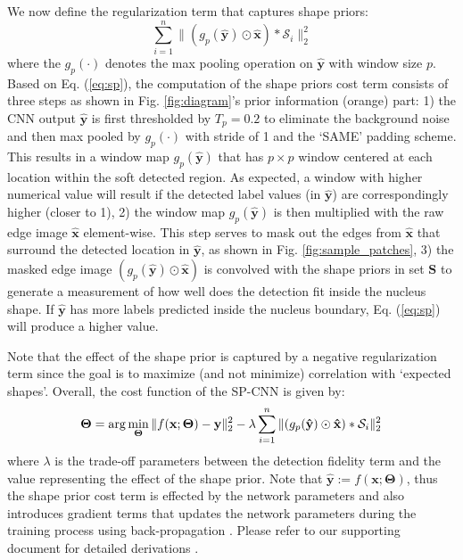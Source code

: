 \documentclass{article}
\begin{document}
We now define the regularization term that captures shape priors:
\begin{equation}
\sum\limits_{i=1}^{n} \|(g_{p}(\mathbf{\hat{y}})\odot \mathbf{\hat{x}}) \ast \mathcal{S}_i \|_2^2\label{eq:sp}
\end{equation}
where the $g_{p}(\cdot)$ denotes the max pooling operation on $\mathbf{\hat{y}}$ with window size $p$. Based on Eq. (\ref{eq:sp}), the computation of the shape priors cost term consists of three steps as shown in Fig. \ref{fig:diagram}'s prior information (orange) part: 1) the CNN output $\mathbf{\hat{y}}$ is first thresholded by $T_p = 0.2$ to eliminate the background noise and then max pooled by $g_p(\cdot)$ with stride of 1 and the `SAME' padding scheme. This results in a window map $g_p(\mathbf{\hat{y}})$ that has $p\times p$ window centered at each location within the soft detected region. 
As expected, a window with higher numerical value will result if the detected label values (in $\mathbf{\hat{y}}$) are correspondingly higher (closer to 1), 2) the window map $g_p(\mathbf{\hat{y}})$ is then multiplied with the raw edge image $\mathbf{\hat{x}}$ element-wise. This step serves to mask out the edges from $\mathbf{\hat{x}}$ that surround the detected location in $\mathbf{\hat{y}}$, as shown in Fig. \ref{fig:sample_patches}, 3) the masked edge image $(g_{p}(\mathbf{\hat{y}})\odot \mathbf{\hat{x}})$ is convolved with the shape priors in set $\mathbf{S}$ to generate a measurement of how well does the detection fit inside the nucleus shape. If  $\mathbf{\hat{y}}$ has more labels predicted inside the nucleus boundary, Eq. (\ref{eq:sp}) will produce a higher value.

Note that the effect of the shape prior is captured by a negative regularization term since the goal is to maximize (and not minimize) correlation with `expected shapes'. Overall, the cost function of the SP-CNN is given by:\vspace{-7pt}
\begin{equation}
\hspace{-1pt}\mathbf{\Theta} = \arg\min\limits_{\mathbf{\Theta}}\|f(\mathbf{x}; \mathbf{\Theta}) - \mathbf{y}\|_2^2 - \lambda\sum\limits_{i=1}^{n}  \|(g_{p}(\mathbf{\hat{y}})\odot \mathbf{\hat{x}}) \ast \mathcal{S}_i \|_2^2
\label{eq:costFunc}\vspace{-7pt}
\end{equation}
where $\lambda$ is the trade-off parameters between the detection fidelity term and the value representing the effect of the shape prior. Note that $\mathbf{\hat{y}}:=f(\mathbf{x}; \mathbf{\Theta})$, thus the shape prior cost term is effected by the network parameters and also introduces gradient terms that updates the network parameters during the training process using back-propagation \cite{lecun2015deep}. Please refer to our supporting document for detailed derivations \cite{webpage}.
\end{document}
